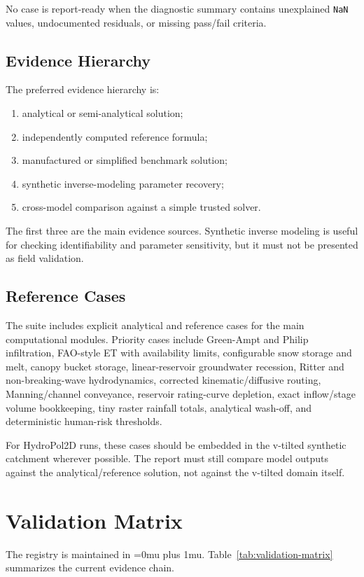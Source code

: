 \documentclass[11pt]{article}
\newcommand{\filepath}[1]{{\small\ttfamily\Urlmuskip=0mu plus 1mu\relax\path{#1}}}
\begin{document}
No case is report-ready when the diagnostic summary contains unexplained \texttt{NaN} values, undocumented residuals, or missing pass/fail criteria.

\subsection{Evidence Hierarchy}
\label{sec:validation-evidence}
The preferred evidence hierarchy is:
\begin{enumerate}
  \item analytical or semi-analytical solution;
  \item independently computed reference formula;
  \item manufactured or simplified benchmark solution;
  \item synthetic inverse-modeling parameter recovery;
  \item cross-model comparison against a simple trusted solver.
\end{enumerate}
The first three are the main evidence sources. Synthetic inverse modeling is useful for checking identifiability and parameter sensitivity, but it must not be presented as field validation.

\subsection{Reference Cases}
\label{sec:validation-reference-cases}
The suite includes explicit analytical and reference cases for the main computational modules. Priority cases include Green-Ampt and Philip infiltration, FAO-style ET with availability limits, configurable snow storage and melt, canopy bucket storage, linear-reservoir groundwater recession, Ritter and non-breaking-wave hydrodynamics, corrected kinematic/diffusive routing, Manning/channel conveyance, reservoir rating-curve depletion, exact inflow/stage volume bookkeeping, tiny raster rainfall totals, analytical wash-off, and deterministic human-risk thresholds.

For HydroPol2D runs, these cases should be embedded in the v-tilted synthetic catchment wherever possible. The report must still compare model outputs against the analytical/reference solution, not against the v-tilted domain itself.

\section{Validation Matrix}
\label{sec:matrix}
The registry is maintained in \filepath{Validation/Validation_Cases.csv}. Table~\ref{tab:validation-matrix} summarizes the current evidence chain.
\end{document}
